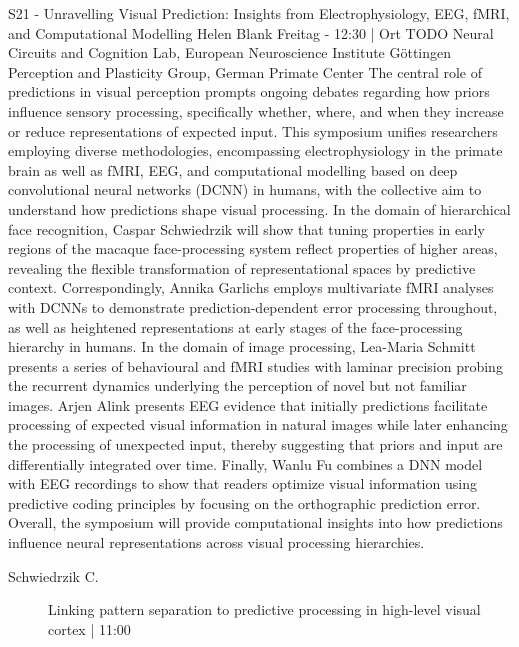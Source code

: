 
            \begin{symposium}
            {S21 - Unravelling Visual Prediction: Insights from Electrophysiology, EEG, fMRI, and Computational Modelling}
            {Helen Blank}
            {Freitag  - 12:30 | Ort TODO}
            {Neural Circuits and Cognition Lab, European Neuroscience Institute Göttingen Perception and Plasticity Group, German Primate Center}
            The central role of predictions in visual perception prompts ongoing debates regarding how priors influence sensory processing, specifically whether, where, and when they increase or reduce representations of expected input. This symposium unifies researchers employing diverse methodologies, encompassing electrophysiology in the primate brain as well as fMRI, EEG, and computational modelling based on deep convolutional neural networks (DCNN) in humans, with the collective aim to understand how predictions shape visual processing.
In the domain of hierarchical face recognition, Caspar Schwiedrzik will show that tuning properties in early regions of the macaque face-processing system reflect properties of higher areas, revealing the flexible transformation of representational spaces by predictive context. Correspondingly, Annika Garlichs employs multivariate fMRI analyses with DCNNs to demonstrate prediction-dependent error processing throughout, as well as heightened representations at early stages of the face-processing hierarchy in humans. In the domain of image processing, Lea-Maria Schmitt presents a series of behavioural and fMRI studies with laminar precision probing the recurrent dynamics underlying the perception of novel but not familiar images. Arjen Alink presents EEG evidence that initially predictions facilitate processing of expected visual information in natural images while later enhancing the processing of unexpected input, thereby suggesting that priors and input are differentially integrated over time. Finally, Wanlu Fu combines a DNN model with EEG recordings to show that readers optimize visual information using predictive coding principles by focusing on the orthographic prediction error. Overall, the symposium will provide computational insights into how predictions influence neural representations across visual processing hierarchies.
            \begin{description}    
            
                \item [ Schwiedrzik C.] Linking pattern separation to predictive processing in high-level visual cortex  \textcolor{mygray}{ | 11:00}    
                

\end{description}
\end{symposium}
